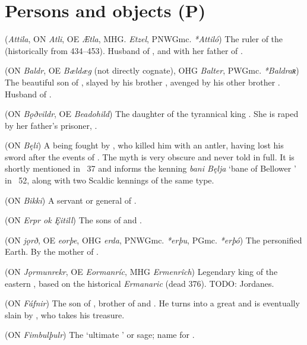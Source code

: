 \section{Persons and objects (P)}
\begin{itemize}

 (\emph{Attila}, ON \emph{Atli}, OE \emph{Ætla}, MHG. \emph{Etzel}, PNWGmc. \emph{*Attiló})
  The ruler of the  (historically from 434–453). Husband of , and with her father of .

 (ON \emph{Baldr}, OE \emph{Bældæg} (not directly cognate), OHG \emph{Balter}, PWGmc. \emph{*Baldraʀ})
  The beautiful son of , slayed by his brother , avenged by his other brother .  Husband of .

 (ON \emph{Bǫðvildr}, OE \emph{Beadohild})
  The daughter of the tyrannical king .  She is raped by her father’s prisoner, .

 (ON \emph{Bęli})
  A being fought by , who killed him with an antler, having lost his sword after the events of \Skirnismal.  The myth is very obscure and never told in full.  It is shortly mentioned in \Gylfaginning\ 37 and informs the kenning \emph{bani Bęlja} ‘bane of Bellower ’ in \Voluspa\ 52, along with two Scaldic kennings of the same type.

 (ON \emph{Bikki})
  A servant or general of .

 (ON \emph{Erpr ok Ęitill})
  The sons of  and .

 (ON \emph{jǫrð}, OE \emph{eorþe}, OHG \emph{erda}, PNWGmc. \emph{*erþu}, PGmc. \emph{*erþó})
  The personified Earth.  By  the mother of .

 (ON \emph{Jǫrmunrekr}, OE \emph{Eormanríc}, MHG \emph{Ermenrîch})
  Legendary king of the eastern , based on the historical \emph{Ermanaric} (dead 376).  TODO: Jordanes.

 (ON \emph{Fáfnir})
  The son of , brother of  and .  He turns into a great  and is eventually slain by , who takes his treasure.

 (ON \emph{Fimbulþulr})
  The ‘ultimate ’ or sage; name for .


\end{itemize}
